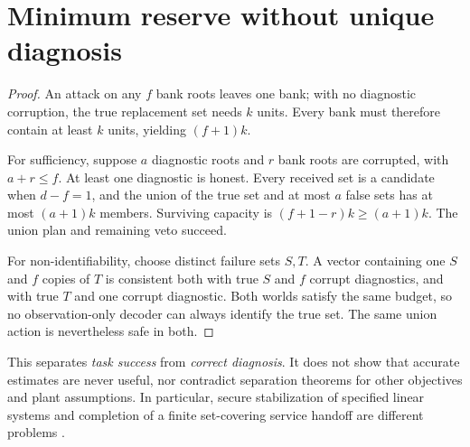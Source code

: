 \section{Minimum reserve without unique diagnosis}
\label{sec:nonseparation}
\begin{proof}
An attack on any $f$ bank roots leaves one bank; with no diagnostic corruption, the true replacement set needs $k$ units. Every bank must therefore contain at least $k$ units, yielding $(f+1)k$.

For sufficiency, suppose $a$ diagnostic roots and $r$ bank roots are corrupted, with $a+r\leq f$. At least one diagnostic is honest. Every received set is a candidate when $d-f=1$, and the union of the true set and at most $a$ false sets has at most $(a+1)k$ members. Surviving capacity is $(f+1-r)k\geq(a+1)k$. The union plan and remaining veto succeed.

For non-identifiability, choose distinct failure sets $S,T$. A vector containing one $S$ and $f$ copies of $T$ is consistent both with true $S$ and $f$ corrupt diagnostics, and with true $T$ and one corrupt diagnostic. Both worlds satisfy the same budget, so no observation-only decoder can always identify the true set. The same union action is nevertheless safe in both.
\end{proof}
This separates \emph{task success} from \emph{correct diagnosis}. It does not show that accurate estimates are never useful, nor contradict separation theorems for other objectives and plant assumptions. In particular, secure stabilization of specified linear systems and completion of a finite set-covering service handoff are different problems \cite{fawzi}.

